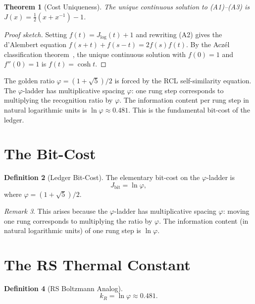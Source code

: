 \documentclass[12pt,a4paper]{article}
\newtheorem{theorem}{Theorem}[section]
\theoremstyle{definition}
\newtheorem{definition}[theorem]{Definition}
\theoremstyle{remark}
\newtheorem{remark}[theorem]{Remark}
\begin{document}
\begin{theorem}[Cost Uniqueness]
\label{thm:unique}
The unique continuous solution to \textup{(A1)--(A3)} is
$J(x) = \tfrac{1}{2}(x + x^{-1}) - 1$.
\end{theorem}

\begin{proof}[Proof sketch]
Setting $f(t) = J_{\log}(t) + 1$ and rewriting \textup{(A2)} gives the
d'Alembert equation $f(s+t) + f(s-t) = 2f(s)f(t)$.  By the Acz\'el
classification theorem~\cite{Aczel1966}, the unique continuous solution
with $f(0) = 1$ and $f''(0) = 1$ is $f(t) = \cosh t$.
\end{proof}

\noindent The golden ratio $\varphi = (1+\sqrt{5})/2$ is forced by the RCL
self-similarity equation.  The $\varphi$-ladder has multiplicative spacing
$\varphi$: one rung step corresponds to multiplying the recognition ratio
by $\varphi$.  The information content per rung step in natural logarithmic
units is $\ln\varphi \approx 0.481$.  This is the fundamental bit-cost of
the ledger.

\section{The Bit-Cost}

\begin{definition}[Ledger Bit-Cost]
The elementary bit-cost on the $\varphi$-ladder is
\begin{equation}
  J_{\mathrm{bit}} = \ln\varphi,
\end{equation}
where $\varphi = (1+\sqrt{5})/2$.
\end{definition}

\begin{remark}
This arises because the $\varphi$-ladder has multiplicative spacing
$\varphi$: moving one rung corresponds to multiplying the ratio by
$\varphi$.  The information content (in natural logarithmic units) of
one rung step is $\ln\varphi$.
\end{remark}

\section{The RS Thermal Constant}

\begin{definition}[RS Boltzmann Analog]
\begin{equation}
  \boxed{k_R = \ln\varphi \approx 0.481.}
\end{equation}
\end{definition}
\end{document}
